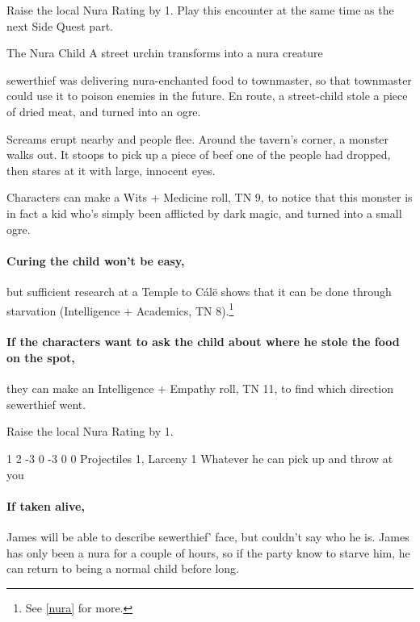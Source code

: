 \begin{multicols}{2}
\begin{boxtext}
\end{boxtext}

Raise the local Nura Rating by 1.
Play this encounter at the same time as the next Side Quest part.

{\N The Nura Child}%
{A street urchin transforms into a nura creature}%

\Gls{sewerthief} was delivering nura-enchanted food to \gls{townmaster}, so that \gls{townmaster} could use it to poison enemies in the future.
En route, a street-child stole a piece of dried meat, and turned into an ogre.

\begin{boxtext}

  Screams erupt nearby and people flee.
  Around the tavern's corner, a monster walks out.
  It stoops to pick up a piece of beef one of the people had dropped, then stares at it with large, innocent eyes.

\end{boxtext}

Characters can make a Wits + Medicine roll, TN 9, to notice that this monster is in fact a kid who's simply been afflicted by dark magic, and turned into a small ogre.

\paragraph{Curing the child won't be easy,}
but sufficient research at a Temple to C\'{a}l\"{e} shows that it can be done through starvation (Intelligence + Academics, TN 8).\footnote{See \autoref{nura} for more.}

\paragraph{If the characters want to ask the child about where he stole the food on the spot,}
they can make an Intelligence + Empathy roll, TN 11, to find which direction \gls{sewerthief} went.

Raise the local Nura Rating by 1.

{1}%
{2}%
{{-3}%
{0}%
{-3}}%
{0}%
{0}%
{Projectiles 1, Larceny 1}%
{Whatever he can pick up and throw at you}%
{}

\paragraph{If taken alive,}
James will be able to describe \gls{sewerthief}' face, but couldn't say who he is.
James has only been a nura for a couple of hours, so if the party know to starve him, he can return to being a normal child before long.


\end{multicols}
